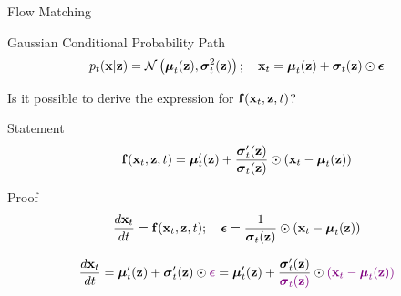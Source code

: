 \documentclass{beamer}
\renewcommand{\eqpause}{}
\begin{document}
\begin{frame}{Flow Matching}
	\begin{block}{Gaussian Conditional Probability Path}
		\vspace{-0.3cm}
		\[
			p_t(\mathbf{x} | \mathbf{z}) = \mathcal{N}\left(\boldsymbol{\mu}_t(\mathbf{z}), \boldsymbol{\sigma}_t^2(\mathbf{z})\right); \quad \mathbf{x}_t = \boldsymbol{\mu}_t(\mathbf{z}) + \boldsymbol{\sigma}_t(\mathbf{z}) \odot \boldsymbol{\epsilon}
		\]
		\vspace{-0.5cm}
	\end{block}
	Is it possible to derive the expression for $\mathbf{f}(\mathbf{x}_t, \mathbf{z}, t)$?
	\eqpause
	\begin{block}{Statement}
		\vspace{-0.3cm}
		\[
			\mathbf{f}(\mathbf{x}_t, \mathbf{z}, t) =  \boldsymbol{\mu}_t'(\mathbf{z}) + \frac{\boldsymbol{\sigma}_t'(\mathbf{z})}{\boldsymbol{\sigma}_t(\mathbf{z})} \odot (\mathbf{x}_t - \boldsymbol{\mu}_t(\mathbf{z}))
		\]
		\vspace{-0.3cm}
	\end{block}
	\eqpause
	\vspace{-0.2cm}
	\begin{block}{Proof}
		\vspace{-0.2cm}
		\[
			\frac{d\mathbf{x}_t}{dt} = \mathbf{f}(\mathbf{x}_t, \mathbf{z}, t); \quad \boldsymbol{\epsilon} = \frac{1}{\boldsymbol{\sigma}_t(\mathbf{z})} \odot (\mathbf{x}_t - \boldsymbol{\mu}_t(\mathbf{z}))
		\]
		\eqpause
		\[
			\frac{d\mathbf{x}_t}{dt} = \boldsymbol{\mu}_t'(\mathbf{z}) + \boldsymbol{\sigma}_t'(\mathbf{z}) \odot {\color{violet}\boldsymbol{\epsilon}} =  \boldsymbol{\mu}_t'(\mathbf{z}) + \frac{\boldsymbol{\sigma}_t'(\mathbf{z})}{{\color{violet}\boldsymbol{\sigma}_t(\mathbf{z})}} \odot {\color{violet}(\mathbf{x}_t - \boldsymbol{\mu}_t(\mathbf{z}))}
		\]
	\end{block}
\end{frame}
\end{document}
